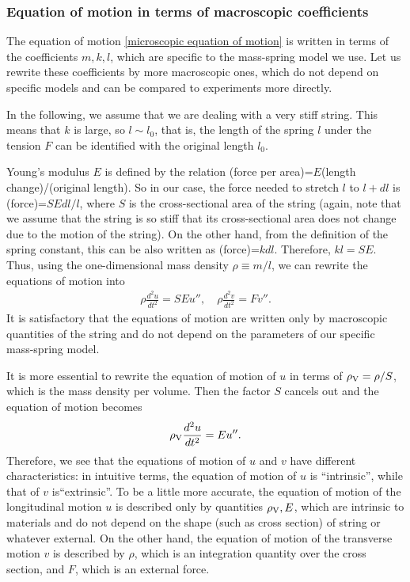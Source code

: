 \documentclass{article}
\begin{document}
\subsubsection{Equation of motion in terms of macroscopic coefficients}
The equation of motion \eqref{microscopic equation of motion} is written in terms of the coefficients $m,k,l$, which are specific to the mass-spring model we use.  
Let us rewrite these coefficients by more macroscopic ones, which do not depend on specific models and can be compared to experiments more directly.    

In the following, we assume that we are dealing with a very stiff string.  This means that $k$ is large, so $l\sim l_0$, that is, the length of the spring $l$ under the tension $F$ can be identified with the original length $l_0$. 


Young's modulus $E$ is defined by the relation (force per area)=$E$(length change)/(original length). So in our case, the force needed to stretch $l$ to $l+dl$ is (force)=$SEdl/l$, where $S$ is the cross-sectional area of the string (again, note that we assume that the string is so stiff that its cross-sectional area does not change due to the motion of the string).  On the other hand, from the definition of the spring constant, this can be also written as (force)=$kdl$.  Therefore, $kl=SE$.  Thus, using the one-dimensional mass density $\rho\equiv m/l$, we can rewrite the equations of motion into  
\begin{align}
    \rho\frac{d^2u}{dt^2} = SE u'', \quad \rho\frac{d^2v}{dt^2} = F v''.  \label{macroscopic equation of motion}
\end{align}
It is satisfactory that the equations of motion are written only by macroscopic quantities of the string and do not depend on the parameters of our specific mass-spring model. 

It is more essential to rewrite the equation of motion of $u$ in terms of $\rho_{\rm V} = \rho/S$, which is the mass density per volume.  Then the factor $S$ cancels out and the equation of motion becomes 
$$
\rho_{\rm V}\frac{d^2u}{dt^2}=Eu''.
$$  
Therefore, we see that the equations of motion of $u$ and $v$ have different characteristics: in intuitive terms, the equation of motion of $u$ is ``intrinsic'', while that of $v$ is``extrinsic''.  To be a little more accurate,
the equation of motion of the longitudinal motion $u$ is described only by quantities $\rho_{\rm V}, E$, which are intrinsic to materials and do not depend on the shape (such as cross section) of string or whatever external. On the other hand, the equation of motion of the transverse motion $v$ is described by $\rho$, which is an integration quantity over the cross section, and $F$, which is an external force.  
\end{document}
